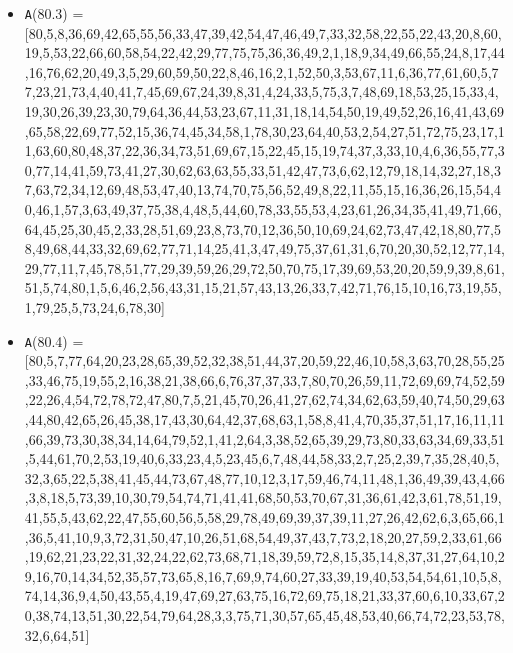 \documentclass[runningheads,a4paper]{llncs}
\begin{document}
\begin{itemize}
	\item {\texttt A(80.3) = } [80,5,8,36,69,42,65,55,56,33,47,39,42,54,47,46,49,7,33,32,58,22,55,22,43,20,8,60,19,5,53,22,66,60,58,54,22,42,29,77,75,75,36,36,49,2,1,18,9,34,49,66,55,24,8,17,44,16,76,62,20,49,3,5,29,60,59,50,22,8,46,16,2,1,52,50,3,53,67,11,6,36,77,61,60,5,77,23,21,73,4,40,41,7,45,69,67,24,39,8,31,4,24,33,5,75,3,7,48,69,18,53,25,15,33,4,19,30,26,39,23,30,79,64,36,44,53,23,67,11,31,18,14,54,50,19,49,52,26,16,41,43,69,65,58,22,69,77,52,15,36,74,45,34,58,1,78,30,23,64,40,53,2,54,27,51,72,75,23,17,11,63,60,80,48,37,22,36,34,73,51,69,67,15,22,45,15,19,74,37,3,33,10,4,6,36,55,77,30,77,14,41,59,73,41,27,30,62,63,63,55,33,51,42,47,73,6,62,12,79,18,14,32,27,18,37,63,72,34,12,69,48,53,47,40,13,74,70,75,56,52,49,8,22,11,55,15,16,36,26,15,54,40,46,1,57,3,63,49,37,75,38,4,48,5,44,60,78,33,55,53,4,23,61,26,34,35,41,49,71,66,64,45,25,30,45,2,33,28,51,69,23,8,73,70,12,36,50,10,69,24,62,73,47,42,18,80,77,58,49,68,44,33,32,69,62,77,71,14,25,41,3,47,49,75,37,61,31,6,70,20,30,52,12,77,14,29,77,11,7,45,78,51,77,29,39,59,26,29,72,50,70,75,17,39,69,53,20,20,59,9,39,8,61,51,5,74,80,1,5,6,46,2,56,43,31,15,21,57,43,13,26,33,7,42,71,76,15,10,16,73,19,55,1,79,25,5,73,24,6,78,30]
	\item {\texttt A(80.4) = } [80,5,7,77,64,20,23,28,65,39,52,32,38,51,44,37,20,59,22,46,10,58,3,63,70,28,55,25,33,46,75,19,55,2,16,38,21,38,66,6,76,37,37,33,7,80,70,26,59,11,72,69,69,74,52,59,22,26,4,54,72,78,72,47,80,7,5,21,45,70,26,41,27,62,74,34,62,63,59,40,74,50,29,63,44,80,42,65,26,45,38,17,43,30,64,42,37,68,63,1,58,8,41,4,70,35,37,51,17,16,11,11,66,39,73,30,38,34,14,64,79,52,1,41,2,64,3,38,52,65,39,29,73,80,33,63,34,69,33,51,5,44,61,70,2,53,19,40,6,33,23,4,5,23,45,6,7,48,44,58,33,2,7,25,2,39,7,35,28,40,5,32,3,65,22,5,38,41,45,44,73,67,48,77,10,12,3,17,59,46,74,11,48,1,36,49,39,43,4,66,3,8,18,5,73,39,10,30,79,54,74,71,41,41,68,50,53,70,67,31,36,61,42,3,61,78,51,19,41,55,5,43,62,22,47,55,60,56,5,58,29,78,49,69,39,37,39,11,27,26,42,62,6,3,65,66,1,36,5,41,10,9,3,72,31,50,47,10,26,51,68,54,49,37,43,7,73,2,18,20,27,59,2,33,61,66,19,62,21,23,22,31,32,24,22,62,73,68,71,18,39,59,72,8,15,35,14,8,37,31,27,64,10,29,16,70,14,34,52,35,57,73,65,8,16,7,69,9,74,60,27,33,39,19,40,53,54,54,61,10,5,8,74,14,36,9,4,50,43,55,4,19,47,69,27,63,75,16,72,69,75,18,21,33,37,60,6,10,33,67,20,38,74,13,51,30,22,54,79,64,28,3,3,75,71,30,57,65,45,48,53,40,66,74,72,23,53,78,32,6,64,51]

\end{itemize}
\end{document}
